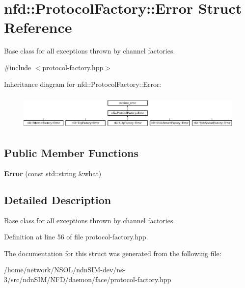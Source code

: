 \hypertarget{structnfd_1_1ProtocolFactory_1_1Error}{}\section{nfd\+:\+:Protocol\+Factory\+:\+:Error Struct Reference}
\label{structnfd_1_1ProtocolFactory_1_1Error}


Base class for all exceptions thrown by channel factories.  




{\ttfamily \#include $<$protocol-\/factory.\+hpp$>$}

Inheritance diagram for nfd\+:\+:Protocol\+Factory\+:\+:Error\+:\begin{figure}[H]
\begin{center}
\leavevmode
\includegraphics[height=1.796791cm]{structnfd_1_1ProtocolFactory_1_1Error}
\end{center}
\end{figure}
\subsection*{Public Member Functions}
\begin{DoxyCompactItemize}
\item 
{\bfseries Error} (const std\+::string \&what)\hypertarget{structnfd_1_1ProtocolFactory_1_1Error_a007ebb64359a6c53b91d194f282fcb17}{}\label{structnfd_1_1ProtocolFactory_1_1Error_a007ebb64359a6c53b91d194f282fcb17}

\end{DoxyCompactItemize}


\subsection{Detailed Description}
Base class for all exceptions thrown by channel factories. 

Definition at line 56 of file protocol-\/factory.\+hpp.



The documentation for this struct was generated from the following file\+:\begin{DoxyCompactItemize}
\item 
/home/network/\+N\+S\+O\+L/ndn\+S\+I\+M-\/dev/ns-\/3/src/ndn\+S\+I\+M/\+N\+F\+D/daemon/face/protocol-\/factory.\+hpp\end{DoxyCompactItemize}
